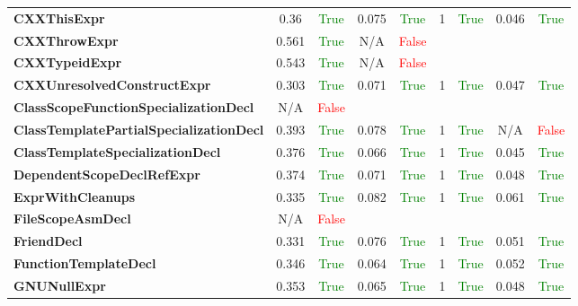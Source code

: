 \documentclass{article}
\begin{document}
\begin{xltabular}{\textwidth}{lcccccccc}
\textbf{{\fontsize{10}{12}\selectfont CXXThisExpr}}& 0.36&\textcolor{green}{True}& 0.075&\textcolor{green}{True}& 1&\textcolor{green}{True}& 0.046&\textcolor{green}{True} \\[0.5ex]
\textbf{{\fontsize{10}{12}\selectfont CXXThrowExpr}}& 0.561&\textcolor{green}{True}& N/A&\textcolor{red}{False} \\[0.5ex]
\textbf{{\fontsize{10}{12}\selectfont CXXTypeidExpr}}& 0.543&\textcolor{green}{True}& N/A&\textcolor{red}{False} \\[0.5ex]
\textbf{{\fontsize{10}{12}\selectfont CXXUnresolvedConstructExpr}}& 0.303&\textcolor{green}{True}& 0.071&\textcolor{green}{True}& 1&\textcolor{green}{True}& 0.047&\textcolor{green}{True} \\[0.5ex]
\textbf{{\fontsize{10}{12}\selectfont ClassScopeFunctionSpecializationDecl}}& N/A&\textcolor{red}{False} \\[0.5ex]
\textbf{{\fontsize{10}{12}\selectfont ClassTemplatePartialSpecializationDecl}}& 0.393&\textcolor{green}{True}& 0.078&\textcolor{green}{True}& 1&\textcolor{green}{True}& N/A&\textcolor{red}{False} \\[0.5ex]
\textbf{{\fontsize{10}{12}\selectfont ClassTemplateSpecializationDecl}}& 0.376&\textcolor{green}{True}& 0.066&\textcolor{green}{True}& 1&\textcolor{green}{True}& 0.045&\textcolor{green}{True} \\[0.5ex]
\textbf{{\fontsize{10}{12}\selectfont DependentScopeDeclRefExpr}}& 0.374&\textcolor{green}{True}& 0.071&\textcolor{green}{True}& 1&\textcolor{green}{True}& 0.048&\textcolor{green}{True} \\[0.5ex]
\textbf{{\fontsize{10}{12}\selectfont ExprWithCleanups}}& 0.335&\textcolor{green}{True}& 0.082&\textcolor{green}{True}& 1&\textcolor{green}{True}& 0.061&\textcolor{green}{True} \\[0.5ex]
\textbf{{\fontsize{10}{12}\selectfont FileScopeAsmDecl}}& N/A&\textcolor{red}{False} \\[0.5ex]
\textbf{{\fontsize{10}{12}\selectfont FriendDecl}}& 0.331&\textcolor{green}{True}& 0.076&\textcolor{green}{True}& 1&\textcolor{green}{True}& 0.051&\textcolor{green}{True} \\[0.5ex]
\textbf{{\fontsize{10}{12}\selectfont FunctionTemplateDecl}}& 0.346&\textcolor{green}{True}& 0.064&\textcolor{green}{True}& 1&\textcolor{green}{True}& 0.052&\textcolor{green}{True} \\[0.5ex]
\textbf{{\fontsize{10}{12}\selectfont GNUNullExpr}}& 0.353&\textcolor{green}{True}& 0.065&\textcolor{green}{True}& 1&\textcolor{green}{True}& 0.048&\textcolor{green}{True} \\[0.5ex]

\end{xltabular}
\end{document}
